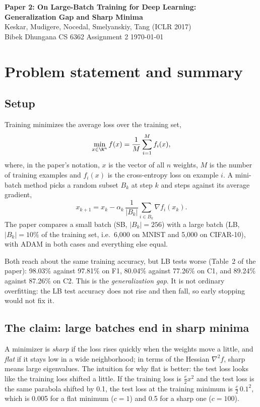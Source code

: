 

\begin{center}
  {\LARGE\bfseries Paper 2: On Large-Batch Training for Deep Learning:\\[2pt] Generalization Gap and Sharp Minima}\\[5pt]
  {\large Keskar, Mudigere, Nocedal, Smelyanskiy, Tang (ICLR 2017)}\\[4pt]
  Bibek Dhungana \quad\textbar\quad CS 6362 Assignment 2 \quad\textbar\quad \today
\end{center}

\section{Problem statement and summary}

\subsection{Setup}
Training minimizes the average loss over the training set,
\[
  \min_{x\in\R^n} f(x)=\frac1M\sum_{i=1}^M f_i(x),
\]
where, in the paper's notation, $x$ is the vector of all $n$ weights, $M$ is the number of training examples and $f_i(x)$ is the cross-entropy loss on example $i$. A mini-batch method picks a random subset $B_k$ at step $k$ and steps against its average gradient,
\[
  x_{k+1}=x_k-\alpha_k\,\frac{1}{|B_k|}\sum_{i\in B_k}\nabla f_i(x_k).
\]
The paper compares a small batch (SB, $|B_k|=256$) with a large batch (LB, $|B_k|=10\%$ of the training set, i.e.\ 6{,}000 on MNIST and 5{,}000 on CIFAR-10), with ADAM in both cases and everything else equal.

Both reach about the same training accuracy, but LB tests worse (Table~2 of the paper): 98.03\% against 97.81\% on F1, 80.04\% against 77.26\% on C1, and 89.24\% against 87.26\% on C2. This is the \emph{generalization gap}. It is not ordinary overfitting: the LB test accuracy does not rise and then fall, so early stopping would not fix it.

\subsection{The claim: large batches end in sharp minima}
A minimizer is \emph{sharp} if the loss rises quickly when the weights move a little, and \emph{flat} if it stays low in a wide neighborhood; in terms of the Hessian $\nabla^2 f$, sharp means large eigenvalues. The intuition for why flat is better: the test loss looks like the training loss shifted a little. If the training loss is $\tfrac{c}{2}x^2$ and the test loss is the same parabola shifted by 0.1, the test loss at the training minimum is $\tfrac{c}{2}\,0.1^2$, which is 0.005 for a flat minimum ($c=1$) and 0.5 for a sharp one ($c=100$).

